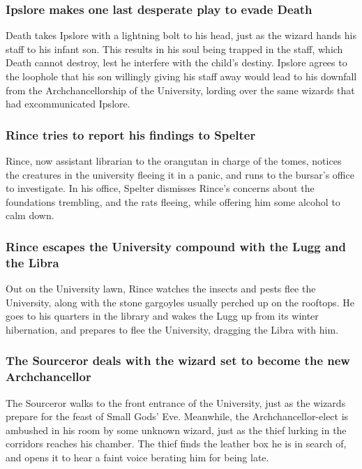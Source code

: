 \subsubsection{\Gls{Ipslore} makes one last desperate play to evade \Gls{Death}}
\Gls{Death} takes \Gls{Ipslore} with a lightning bolt to his head, just as the wizard hands his
staff to his infant son. This results in his soul being trapped in the staff, which \Gls{Death}
cannot destroy, lest he interfere with the child's destiny. \Gls{Ipslore} agrees to the loophole
that his son willingly giving his staff away would lead to his downfall from the Archchancellorship
of the University, lording over the same wizards that had excommunicated \Gls{Ipslore}.

\subsubsection{\Gls{Rince} tries to report his findings to \Gls{Spelter}}
\Gls{Rince}, now assistant librarian to the orangutan in charge of the tomes, notices the
creatures in the university fleeing it in a panic, and runs to the bursar's office to investigate.
In his office, \Gls{Spelter} dismisses \Gls{Rince}'s concerns about the foundations trembling, and
the rats fleeing, while offering him some alcohol to calm down.

\subsubsection{\Gls{Rince} escapes the University compound with the \Gls{Lugg} and the \Gls{Libra}}
Out on the University lawn, \Gls{Rince} watches the insects and pests flee the University, along
with the stone gargoyles usually perched up on the rooftops. He goes to his quarters in the library
and wakes the \Gls{Lugg} up from its winter hibernation, and prepares to flee the University,
dragging the \Gls{Libra} with him.

\subsubsection{The Sourceror deals with the wizard set to become the new Archchancellor}
The Sourceror walks to the front entrance of the University, just as the wizards prepare for the
feast of Small Gods' Eve. Meanwhile, the Archchancellor-elect is ambushed in his room by some
unknown wizard, just as the thief lurking in the corridors reaches his chamber. The thief finds the
leather box he is in search of, and opens it to hear a faint voice berating him for being late.

